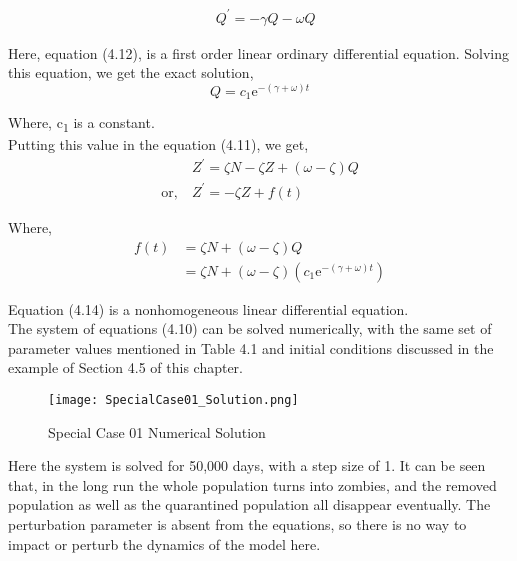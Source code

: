 \begin{equation}
\begin{aligned}
&Q^{\prime}=-\gamma Q-\omega Q
\end{aligned}
\end{equation}

Here, equation (4.12), is a first order linear ordinary differential equation. Solving this equation, we get the exact solution, \\

\begin{equation}
Q=c_{1} \mathrm{e}^{-(\gamma+\omega) t}
\end{equation}

Where, c\textsubscript{1} is a constant. \\

Putting this value in the equation (4.11), we get, \\

\begin{equation}
\begin{aligned}
&Z^{\prime}=\zeta N-\zeta Z+(\omega-\zeta) Q \\
\text {or}, \ &Z^{\prime}=-\zeta Z+f(t)
\end{aligned}
\end{equation}

Where, 
\begin{align*} f(t)& = \zeta N + (\omega - \zeta)Q \\
 & = \zeta N + (\omega - \zeta)(c_{1} \mathrm{e}^{-(\gamma+\omega) t}) \end{align*}

Equation (4.14) is a nonhomogeneous linear differential equation. \\

The system of equations (4.10) can be solved numerically, with the same set of parameter values mentioned in Table 4.1 and initial conditions discussed in the example of Section 4.5 of this chapter. \\

\begin{figure}[H]
\centering
\texttt{[image: SpecialCase01\_Solution.png]}
\caption{Special Case 01 Numerical Solution}
\label{fig:Special Case 01 Solution}
\end{figure}

Here the system is solved for 50,000 days, with a step size of 1. It can be seen that, in the long run the whole population turns into zombies, and the removed population as well as the quarantined population all disappear eventually. The perturbation parameter is absent from the equations, so there is no way to impact or perturb the dynamics of the model here. \\

